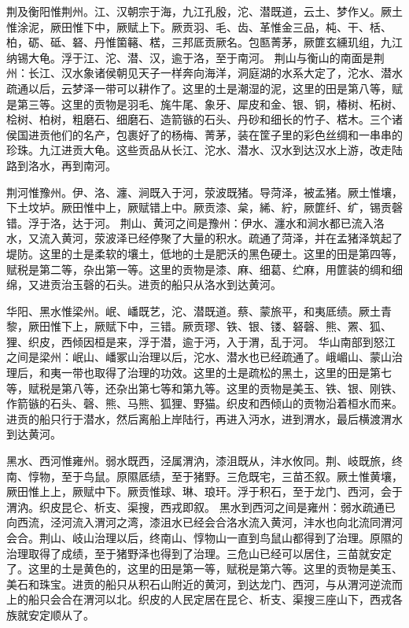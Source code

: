\documentclass[12pt,UTF8]{ctexbook}
\begin{document}
荆及衡阳惟荆州。江、汉朝宗于海，九江孔殷，沱、潜既道，云土、梦作乂。厥土惟涂泥，厥田惟下中，厥赋上下。厥贡羽、毛、齿、革惟金三品，杶、干、栝、柏，砺、砥、砮、丹惟箘簵、楛，三邦厎贡厥名。包匦菁茅，厥篚玄纁玑组，九江纳锡大龟。浮于江、沱、潜、汉，逾于洛，至于南河。
荆山与衡山的南面是荆州：长江、汉水象诸侯朝见天子一样奔向海洋，洞庭湖的水系大定了，沱水、潜水疏通以后，云梦泽一带可以耕作了。这里的土是潮湿的泥，这里的田是第八等，赋是第三等。这里的贡物是羽毛、旄牛尾、象牙、犀皮和金、银、铜，椿树、柘树、桧树、柏树，粗磨石、细磨石、造箭镞的石头、丹砂和细长的竹子、楛木。三个诸侯国进贡他们的名产，包裹好了的杨梅、菁茅，装在筐子里的彩色丝绸和一串串的珍珠。九江进贡大龟。这些贡品从长江、沱水、潜水、汉水到达汉水上游，改走陆路到洛水，再到南河。

荆河惟豫州。伊、洛、瀍、涧既入于河，荥波既猪。导菏泽，被孟猪。厥土惟壤，下土坟垆。厥田惟中上，厥赋错上中。厥贡漆、枲，絺、紵，厥篚纤、纩，锡贡磬错。浮于洛，达于河。
荆山、黄河之间是豫州：伊水、瀍水和涧水都已流入洛水，又流入黄河，荥波泽已经停聚了大量的积水。疏通了菏泽，并在孟猪泽筑起了堤防。这里的土是柔软的壤土，低地的土是肥沃的黑色硬土。这里的田是第四等，赋税是第二等，杂出第一等。这里的贡物是漆、麻、细葛、纻麻，用篚装的绸和细绵，又进贡治玉磬的石头。进贡的船只从洛水到达黄河。

华阳、黑水惟梁州。岷、嶓既艺，沱、潜既道。蔡、蒙旅平，和夷厎绩。厥土青黎，厥田惟下上，厥赋下中，三错。厥贡璆、铁、银、镂、砮磬、熊、罴、狐、狸、织皮，西倾因桓是来，浮于潜，逾于沔，入于渭，乱于河。
华山南部到怒江之间是梁州：岷山、嶓冢山治理以后，沱水、潜水也已经疏通了。峨嵋山、蒙山治理后，和夷一带也取得了治理的功效。这里的土是疏松的黑土，这里的田是第七等，赋税是第八等，还杂出第七等和第九等。这里的贡物是美玉、铁、银、刚铁、作箭镞的石头、磬、熊、马熊、狐狸、野猫。织皮和西倾山的贡物沿着桓水而来。进贡的船只行于潜水，然后离船上岸陆行，再进入沔水，进到渭水，最后横渡渭水到达黄河。

黑水、西河惟雍州。弱水既西，泾属渭汭，漆沮既从，沣水攸同。荆、岐既旅，终南、惇物，至于鸟鼠。原隰厎绩，至于猪野。三危既宅，三苗丕叙。厥土惟黄壤，厥田惟上上，厥赋中下。厥贡惟球、琳、琅玕。浮于积石，至于龙门、西河，会于渭汭。织皮昆仑、析支、渠搜，西戎即叙。
黑水到西河之间是雍州：弱水疏通已向西流，泾河流入渭河之湾，漆沮水已经会合洛水流入黄河，沣水也向北流同渭河会合。荆山、岐山治理以后，终南山、惇物山一直到鸟鼠山都得到了治理。原隰的治理取得了成绩，至于猪野泽也得到了治理。三危山已经可以居住，三苗就安定了。这里的土是黄色的，这里的田是第一等，赋税是第六等。这里的贡物是美玉、美石和珠宝。进贡的船只从积石山附近的黄河，到达龙门、西河，与从渭河逆流而上的船只会合在渭河以北。织皮的人民定居在昆仑、析支、渠搜三座山下，西戎各族就安定顺从了。
\end{document}
